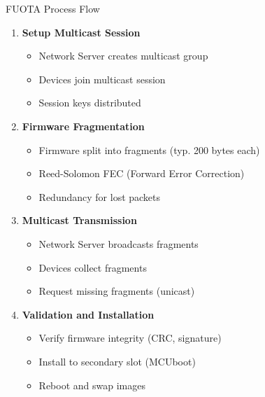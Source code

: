 \documentclass{beamer}
\begin{document}
\begin{frame}{FUOTA Process Flow}
\begin{enumerate}
    \item \textbf{Setup Multicast Session}
    \begin{itemize}
        \item Network Server creates multicast group
        \item Devices join multicast session
        \item Session keys distributed
    \end{itemize}

    \item \textbf{Firmware Fragmentation}
    \begin{itemize}
        \item Firmware split into fragments (typ. 200 bytes each)
        \item Reed-Solomon FEC (Forward Error Correction)
        \item Redundancy for lost packets
    \end{itemize}

    \item \textbf{Multicast Transmission}
    \begin{itemize}
        \item Network Server broadcasts fragments
        \item Devices collect fragments
        \item Request missing fragments (unicast)
    \end{itemize}

    \item \textbf{Validation and Installation}
    \begin{itemize}
        \item Verify firmware integrity (CRC, signature)
        \item Install to secondary slot (MCUboot)
        \item Reboot and swap images
    \end{itemize}
\end{enumerate}
\end{frame}
\end{document}

